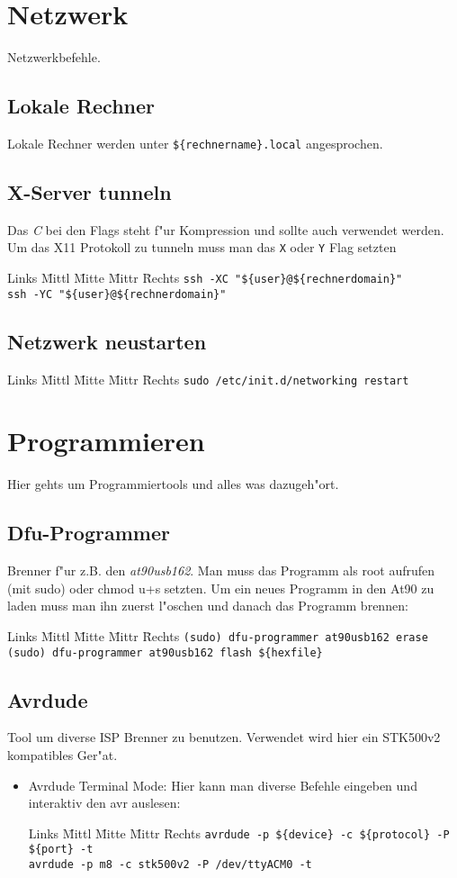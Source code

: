 \documentclass[12pt]{article}
\newenvironment{code}{\begin{tabbing}Links \= Mittl \= Mitte \= Mittr \= Rechts \kill}{\end{tabbing}}
\begin{document}
\section{Netzwerk}
Netzwerkbefehle.
\subsection{Lokale Rechner}
Lokale Rechner werden unter \verb#${rechnername}.local# angesprochen.
\subsection{X-Server tunneln}
Das \textit{C} bei den Flags steht f"ur Kompression und sollte auch verwendet werden. Um das X11 Protokoll zu tunneln muss man das \verb#X# oder \verb#Y# Flag setzten
\begin{code}
	\> \verb#ssh -XC "${user}@${rechnerdomain}"# \\
	\> \verb#ssh -YC "${user}@${rechnerdomain}"#
\end{code}
\subsection{Netzwerk neustarten}
\begin{code}
	\> \verb#sudo /etc/init.d/networking restart#
\end{code}

\section{Programmieren}
Hier gehts um Programmiertools und alles was dazugeh"ort.
\subsection{Dfu-Programmer}
Brenner f"ur z.B. den \textit{at90usb162}. Man muss das Programm als root aufrufen (mit sudo) oder
chmod u+s setzten.
Um ein neues Programm in den At90 zu laden muss man ihn zuerst l"oschen und danach das Programm brennen:
\begin{code}
	\> \verb#(sudo) dfu-programmer at90usb162 erase# \\
	\> \verb#(sudo) dfu-programmer at90usb162 flash ${hexfile}#	
\end{code}
\subsection{Avrdude}
Tool um diverse ISP Brenner zu benutzen. Verwendet wird hier ein STK500v2 kompatibles Ger"at.
\begin{itemize}
	\item Avrdude Terminal Mode: Hier kann man diverse Befehle eingeben und interaktiv den avr auslesen:
	\begin{code}
		\> \verb#avrdude -p ${device} -c ${protocol} -P ${port} -t# \\
		\> \verb#avrdude -p m8 -c stk500v2 -P /dev/ttyACM0 -t#
	\end{code}
\end{itemize}
\end{document}
